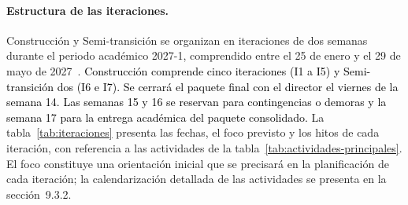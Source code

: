 \paragraph{Estructura de las iteraciones.}
Construcción y Semi-transición se organizan en iteraciones de dos semanas durante el periodo académico 2027-1, comprendido entre el 25 de enero y el 29 de mayo de 2027~\cite{javerianaCalendario2027}. \textcolor{black}{Construcción comprende cinco iteraciones (I1 a I5) y Semi-transición dos (I6 e I7). Se cerrará el paquete final con el director el viernes de la semana 14. Las semanas 15 y 16 se reservan para contingencias o demoras y la semana 17 para la entrega académica del paquete consolidado.} La tabla~\ref{tab:iteraciones} presenta las fechas, el foco previsto y los hitos de cada iteración, con referencia a las actividades de la tabla~\ref{tab:actividades-principales}. El foco constituye una orientación inicial que se precisará en la planificación de cada iteración; la calendarización detallada de las actividades se presenta en la sección~9.3.2.

